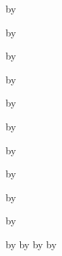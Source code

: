 \newcount\CollaboratorF
{}
\advance\CollaboratorCitations by \CollaboratorF

\newcount\CollaboratorG
{}
\advance\CollaboratorCitations by \CollaboratorG

\newcount\CollaboratorH
{}
\advance\CollaboratorCitations by \CollaboratorH

\newcount\CollaboratorI
{}
\advance\CollaboratorCitations by \CollaboratorI

\newcount\CollaboratorJ
{}
\advance\CollaboratorCitations by \CollaboratorJ

\newcount\CollaboratorK
{}
\advance\CollaboratorCitations by \CollaboratorK

\newcount\CollaboratorL
{}
\advance\CollaboratorCitations by \CollaboratorL

\newcount\CollaboratorM
{}
\advance\CollaboratorCitations by \CollaboratorM

\newcount\CollaboratorN
{}
\advance\CollaboratorCitations by \CollaboratorN

\newcount\CollaboratorO
{}
\advance\CollaboratorCitations by \CollaboratorO



\newcount\TotalCitations
{}

\advance\TotalCitations by \FirstAuthorCitations
\advance\TotalCitations by \StudentAuthorCitations
\advance\TotalCitations by \CoauthorCitations
\advance\TotalCitations by \CollaboratorCitations


\newcount\FirstAuthorPublications
{}


